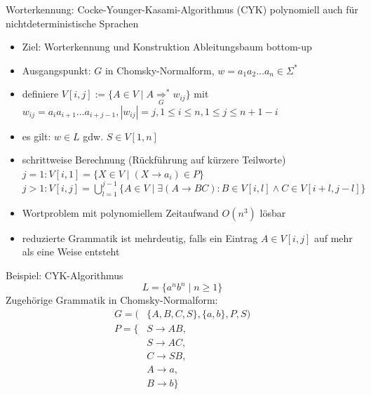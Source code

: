 \begin{frame}{Worterkennung: Cocke-Younger-Kasami-Algorithmus (CYK)}
	polynomiell auch für nichtdeterministische Sprachen
	\begin{itemize}
		\item Ziel: Worterkennung und Konstruktion Ableitungsbaum bottom-up
		\item Ausgangspunkt: $G$ in Chomsky-Normalform, $w=a_1a_2 \ldots a_n \in \Sigma^*$
		\item definiere $V[i,j]:=\{A \in V \mid A \underset{G}{\Rightarrow}^* w_{ij} \}$ mit\\
		$w_{ij}=a_ia_{i+1}\ldots a_{i+j-1}, |w_{ij}|=j, 1\leq i \leq n, 1\leq j \leq n+1-i$
		\item es gilt: $w\in L$ gdw. $S \in V[1,n]$
		\item schrittweise Berechnung (Rückführung auf kürzere Teilworte)\\
		$j=1: V[i,1]=\{X \in V \mid (X\rightarrow a_i) \in P\}$\\
		$j>1: V[i,j]=\bigcup_{l=1}^{j-1}\{A\in V\mid \exists (A\rightarrow BC): B \in V[i,l] \land C \in V[i+l, j-l] \}$
		\item Wortproblem mit polynomiellem Zeitaufwand $O(n^3)$ lösbar
		\item reduzierte Grammatik ist mehrdeutig, falls ein Eintrag $A \in V[i,j]$ auf mehr als eine Weise entsteht
	\end{itemize}
\end{frame}

\begin{frame}{Beispiel: CYK-Algorithmus}
	$$L=\{a^nb^n\mid n\geq 1\}$$
	Zugehörige Grammatik in Chomsky-Normalform:
	\begin{align*}
		G=(&\{A, B, C, S\}, \{a, b\}, P, S)\\
		P=\{&S \rightarrow AB,\\
		    &S \rightarrow AC,\\
		    &C\rightarrow SB,\\
		    &A\rightarrow a,\\
		    &B\rightarrow b\}
	\end{align*}
	
\end{frame}

